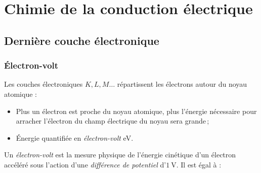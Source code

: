 
\begin{comment}

\documentclass[a4paper, 11pt, twoside, fleqn]{memoir}

\usepackage{AOCDTF}





	\openleft %
	\Frametrue %

\end{comment}


\chapter{Chimie de la conduction électrique}
\ChapFrame %

\section{Dernière couche électronique}

\subsection{\'Electron-volt}

Les couches électroniques $K, L, M\ldots$ répartissent les électrons autour du noyau atomique :
\begin{itemize}
\item Plus un électron est proche du noyau atomique, plus l'énergie nécessaire pour arracher l'électron du champ électrique du noyau sera grande\,;
\item \'Energie quantifiée en \emph{électron-volt} \si{\electronvolt}.
\end{itemize}
Un \emph{électron-volt} est la mesure physique de l'énergie cinétique d'un électron accéléré sous l'action d'une \emph{différence de potentiel} d'$\SI{1}{\volt}$. Il est égal à : 

